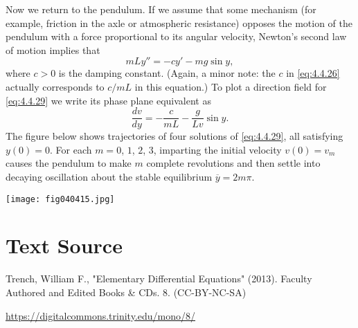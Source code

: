 \documentclass{ximera}
\begin{document}
 
\begin{example}\label{example:4.4.5}
Now we
return to the pendulum. If we assume that
some mechanism (for example, friction in the axle or atmospheric
resistance) opposes the motion of the pendulum with a force
proportional to its angular velocity,  Newton's second law of
motion implies that
\begin{equation} \label{eq:4.4.29}
mLy''=-cy'-mg\sin y,
\end{equation}
where $c>0$ is the damping constant. (Again, a minor note: the $c$
in \eqref{eq:4.4.26} actually corresponds to $c/mL$ in this equation.)
To plot a direction field for \eqref{eq:4.4.29} we write its phase plane
equivalent as
$$
\frac{dv}{dy}=-\frac{c}{mL}-\frac{g}{Lv}\sin y.
$$
The figure below shows
trajectories of four solutions of \eqref{eq:4.4.29}, all satisfying
$y(0)=0$. For each $m=0$, $1$, $2$, $3$, imparting the initial velocity
$v(0)=v_m$ causes the pendulum to make $m$ complete revolutions and
then settle into decaying oscillation about the stable equilibrium
$\overline{y}=2m\pi$.
 
\begin{image}
 \texttt{[image: fig040415.jpg]}
\end{image}
 
 
\end{example}
 
 
 
 
 
 
\section*{Text Source}
Trench, William F., "Elementary Differential Equations" (2013). Faculty Authored and Edited Books \& CDs. 8. (CC-BY-NC-SA)
 
\href{https://digitalcommons.trinity.edu/mono/8/}{https://digitalcommons.trinity.edu/mono/8/}
 
 
\end{document}
